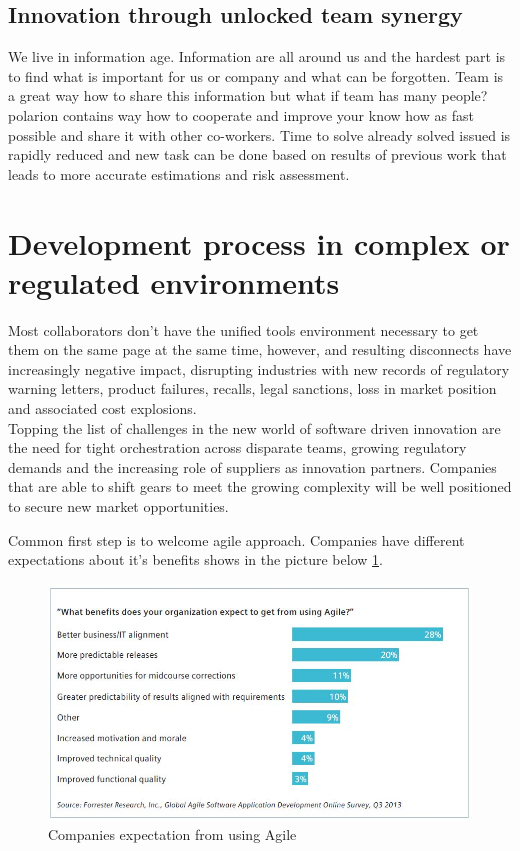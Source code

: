 \documentclass[thesis=M,english]{FITthesis}[2012/06/26]
\begin{document}
\subsection{Innovation through unlocked team synergy}

We live in information age. Information are all around us and the hardest part is to find what is important for us or company and what can be forgotten. Team is a great way how to share this information but what if team has many people? \acrshort{polarion} contains way how to cooperate and improve your know how as fast possible and share it with other co-workers. Time to solve already solved issued is rapidly reduced and new task can be done based on results of previous work that leads to more accurate estimations and risk assessment.

\section{Development process in complex or regulated environments}

Most collaborators don’t have the unified tools environment necessary to get them on the same page at the same time, however, and resulting disconnects have increasingly negative impact, disrupting industries with new records of regulatory warning letters, product failures, recalls, legal sanctions, loss in market position and associated cost explosions.\\

Topping the list of challenges in the new world of software driven innovation are the need for tight orchestration across disparate teams, growing regulatory demands and the increasing role of suppliers as innovation partners. Companies that are able to shift gears to meet the growing complexity will be well positioned to secure new market opportunities.

Common first step is to welcome agile approach. Companies have different expectations about it's benefits shows in the picture below \ref{fig:agile_benefits}.

\begin{figure}[h!]\centering
	\includegraphics[width=1\textwidth]{pictures/agile_benefits}
	\caption{Companies expectation from using Agile\cite{polarion_alm}}\label{fig:agile_benefits}
\end{figure}
\end{document}
